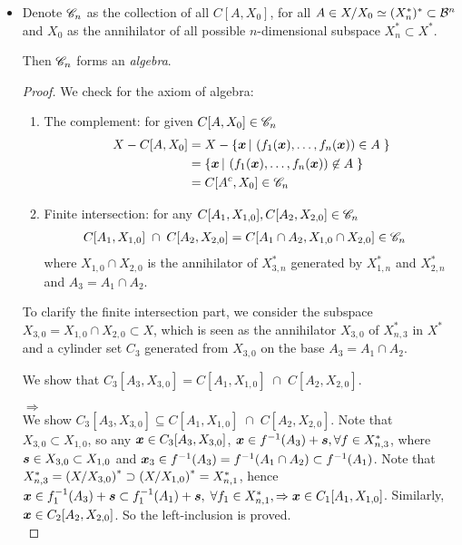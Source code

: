 \documentclass[11pt]{article}
\begin{document}
\begin{itemize}
\item \begin{proposition}
Denote ${\mathscr C}_{n}$ as the collection of all $C[A, X_{0}]$, for all $A\in X/X_{0}\simeq (X_{n}^{*})^{*}\subset {\mathcal B}^{n}$ and $X_{0}$ as the annihilator of all possible $n$-dimensional subspace $X_{n}^{*} \subset X^{*}$. 

Then ${\mathscr C}_{n}$ forms an \emph{algebra}.
\end{proposition}
\begin{proof}
We check for the axiom of algebra: 
\begin{enumerate}
\item The complement: for given $C[A, X_{0}] \in {\mathscr C}_{n}$
\begin{align*}
X- C[A, X_{0}]&= X-  \left\{\boldsymbol{x}\,|\, \left(f_{1}(\boldsymbol{x}),  \ldots, f_{n}(\boldsymbol{x})\right) \in A\;  \right\} \\
&= \left\{\boldsymbol{x}\,|\, \left(f_{1}(\boldsymbol{x}),  \ldots, f_{n}(\boldsymbol{x})\right) \not\in A\;  \right\} \\
&= C[A^{c}, X_{0}]\in {\mathscr C}_{n}
\end{align*} 

\item Finite intersection: for any $C[A_{1}, X_{1,0}], C[A_{2}, X_{2,0}] \in {\mathscr C}_{n}$
\begin{align*}
C[A_{1}, X_{1,0}]\;\cap\; C[A_{2}, X_{2,0}]
&= C[A_{1}\cap A_{2}, X_{1,0}\cap X_{2,0}]\in {\mathscr C}_{n}
\end{align*}
where $X_{1,0}\cap X_{2,0}$ is the annihilator of $X_{3,n}^{*}$ generated by $X_{1,n}^{*}$ and $X_{2,n}^{*}$
and $A_{3} = A_{1}\cap A_{2}$.
\end{enumerate}

To clarify the finite intersection part, we consider the subspace $X_{3,0} = X_{1,0} \cap X_{2,0} \subset X$, which is seen as the annihilator $X_{3,0}$ of $X^{*}_{n,3}$ in $X^{*}$ and a cylinder set $C_{3}$ generated from $X_{3,0}$ on the base $A_{3} = A_{1}\cap A_{2}$. 

We show that $C_{3}[A_{3}, X_{3,0}] = C[A_{1}, X_{1,0}]\;\cap\; C[A_{2}, X_{2,0}]$. 

$\Rightarrow$\\
 We show $C_{3}[A_{3}, X_{3,0}] \subseteq C[A_{1}, X_{1,0}]\;\cap\; C[A_{2}, X_{2,0}]$. Note that $X_{3,0}\subset X_{1,0}$, so any $\boldsymbol{x}\in C_{3}[A_{3}, X_{3,0}]$, $\boldsymbol{x}\in f^{-1}(A_{3})+ \boldsymbol{s}, \forall f\in X^{*}_{n,3}$, where $\boldsymbol{s}\in X_{3,0}\subset X_{1,0}$ and $\boldsymbol{x}_{3} \in f^{-1}(A_{3})=   f^{-1}(A_{1}\cap A_{2})\subset f^{-1}(A_{1})$. Note that $X^{*}_{n,3} = \left(X/X_{3,0}\right)^{*} \supset \left(X/X_{1,0}\right)^{*} = X^{*}_{n,1}$, hence  $\boldsymbol{x}\in f_{1}^{-1}(A_{3})+ \boldsymbol{s} \subset f_{1}^{-1}(A_{1})+ \boldsymbol{s},\; \forall f_{1}\in X^{*}_{n,1}  , \Rightarrow \boldsymbol{x} \in C_{1}[A_{1}, X_{1,0}]$. Similarly,  $\boldsymbol{x}\in C_{2}[A_{2}, X_{2,0}]$. So the left-inclusion is proved. \\


\end{proof}
\end{itemize}
\end{document}
